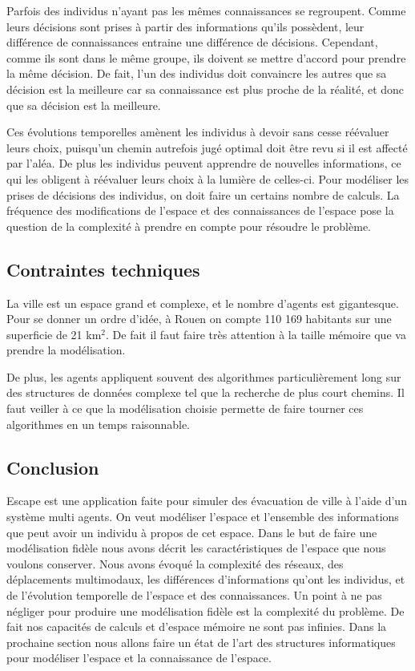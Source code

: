 \documentclass[a4paper]{article}
\begin{document}
Parfois des individus n'ayant pas les mêmes connaissances se regroupent. Comme
leurs décisions sont prises à partir des informations qu'ils possèdent, leur
différence de connaissances entraine une différence de décisions. Cependant,
comme ils sont dans le même groupe, ils doivent se mettre d'accord pour prendre
la même décision. De fait, l'un des individus doit convaincre les autres que sa
décision est la meilleure car sa connaissance est plus proche de la réalité, et
donc que sa décision est la meilleure.

Ces évolutions temporelles amènent les individus à devoir sans cesse réévaluer
leurs choix, puisqu'un chemin autrefois jugé optimal doit être revu si il est
affecté par l'aléa. De plus les individus peuvent apprendre de nouvelles
informations, ce qui les obligent à réévaluer leurs choix à la lumière de
celles-ci. Pour modéliser les prises de décisions des individus, on doit faire
un certains nombre de calculs. La fréquence des modifications de l'espace et des
connaissances de l'espace pose la question de la complexité à prendre en compte
pour résoudre le problème.

\subsection{Contraintes techniques}

La ville est un espace grand et complexe, et le nombre d'agents est gigantesque.
Pour se donner un ordre d'idée, à Rouen on compte 110 169 habitants sur une
superficie de 21 km$^2$. De fait il faut faire très attention à la taille
mémoire que va prendre la modélisation.

De plus, les agents appliquent souvent des algorithmes particulièrement long sur
des structures de données complexe tel que la recherche de plus court chemins.
Il faut veiller à ce que la modélisation choisie permette de faire tourner ces
algorithmes en un temps raisonnable.

\subsection{Conclusion}

Escape est une application faite pour simuler des évacuation de ville à l'aide
d'un système multi agents. On veut modéliser l'espace et l'ensemble des
informations que peut avoir un individu à propos de cet espace. Dans le but de
faire une modélisation fidèle nous avons décrit les caractéristiques de l'espace
que nous voulons conserver. Nous avons évoqué la complexité des réseaux, des
déplacements multimodaux, les différences d'informations qu'ont les individus,
et de l'évolution temporelle de l'espace et des connaissances. Un point à ne pas
négliger pour produire une modélisation fidèle est la complexité du problème. De
fait nos capacités de calculs et d'espace mémoire ne sont pas infinies. Dans la
prochaine section nous allons faire un état de l'art des structures
informatiques pour modéliser l'espace et la connaissance de l'espace.
\end{document}
